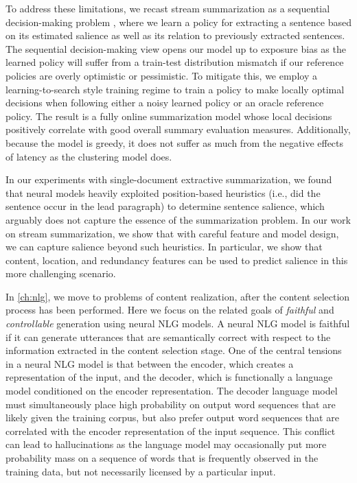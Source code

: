 To address these limitations, we recast stream summarization as a sequential
decision-making problem \citep{littman1996}, where we learn a policy for
extracting a sentence based on its estimated salience as well as its relation
to previously extracted sentences.  The sequential decision-making view opens
our model up to exposure bias as the learned policy will suffer from a
train-test distribution mismatch if our reference policies are overly
optimistic or pessimistic.  To mitigate this, we employ a learning-to-search
style training regime \citep{chang2015} to train a policy to make locally
optimal decisions when following either a noisy learned policy or an oracle
reference policy.  The result is a fully online summarization model whose local
decisions positively correlate with good overall summary evaluation measures.
Additionally, because the model is greedy, it does not suffer as much from the
negative effects of latency as the clustering model does.
      
In our experiments with single-document extractive summarization, we found that
neural models heavily exploited position-based heuristics (i.e., did the
sentence occur in the lead paragraph) to determine sentence salience, which
arguably does not capture the essence of the summarization problem. In our work
on stream summarization, we show that with careful feature and model design, we
can capture salience beyond such heuristics.  In particular, we show that
content, location, and redundancy features can be used to predict salience in
this more challenging scenario.

In \autoref{ch:nlg}, we move to problems of content realization, after the
content selection process has been performed.  Here we focus on the related
goals of \textit{faithful} and \textit{controllable} generation using neural
NLG models. A neural NLG model is faithful if it can generate utterances that
are semantically correct with respect to the information extracted in the
content selection stage.  One of the central tensions in a neural NLG model is
that between the encoder, which creates a representation of the input, and the
decoder, which is functionally a language model conditioned on the encoder
representation.  The decoder language model must simultaneously place high
probability on output word sequences that are likely given the training corpus,
but also prefer output word sequences that are correlated with the encoder
representation of the input sequence. This conflict can lead to hallucinations
as the language model may occasionally put more probability mass on a sequence
of words that is frequently observed in the training data, but not necessarily
licensed by a particular input.

